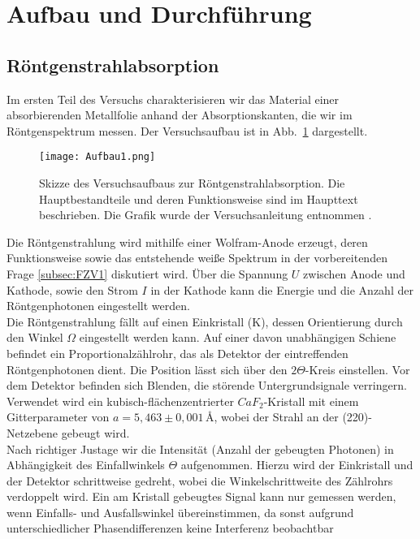 \section{\label{sec:aufbau}Aufbau und Durchführung}
\subsection{\label{subsec:vers1}Röntgenstrahlabsorption}
Im ersten Teil des Versuchs charakterisieren wir das Material einer absorbierenden Metallfolie anhand 
der Absorptionskanten, die wir im Röntgenspektrum messen. Der Versuchsaufbau ist in Abb.~\ref{fig:vers1}
dargestellt.
\begin{figure}[h!]
    \centering
    \texttt{[image: Aufbau1.png]}
    \caption{\label{fig:vers1}Skizze des Versuchsaufbaus zur Röntgenstrahlabsorption. Die Hauptbestandteile und deren 
    Funktionsweise sind im Haupttext beschrieben. Die Grafik wurde der Versuchsanleitung entnommen \cite{Anleitung}.}
\end{figure}\FloatBarrier
Die Röntgenstrahlung wird mithilfe einer Wolfram-Anode erzeugt, deren Funktionsweise 
sowie das entstehende weiße Spektrum in der vorbereitenden 
Frage \ref{subsec:FZV1} diskutiert wird. Über die Spannung $U$ zwischen Anode und 
Kathode, sowie den Strom $I$ in der Kathode kann die Energie und die Anzahl der 
Röntgenphotonen eingestellt werden. \\
Die Röntgenstrahlung fällt auf einen Einkristall (K), dessen Orientierung 
durch den Winkel $\Omega$ eingestellt werden kann. Auf einer davon unabhängigen 
Schiene befindet ein Proportionalzählrohr, das als Detektor der eintreffenden 
Röntgenphotonen dient. Die Position lässt sich über den $2\Theta$-Kreis einstellen. 
Vor dem Detektor befinden sich Blenden, die störende Untergrundsignale 
verringern. \\
Verwendet wird ein kubisch-flächenzentrierter $CaF_{2}$-Kristall mit 
einem Gitterparameter von $a= 5,463\pm 0,001\,\si{\angstrom}$, wobei 
der Strahl an der (220)-Netzebene gebeugt wird. \\
Nach richtiger Justage wir die Intensität (Anzahl der gebeugten Photonen) in 
Abhängigkeit des Einfallwinkels $\Theta$ aufgenommen. Hierzu wird der 
Einkristall und der Detektor schrittweise gedreht, wobei die Winkelschrittweite 
des Zählrohrs verdoppelt wird. Ein am Kristall gebeugtes Signal kann nur 
gemessen werden, wenn Einfalls- und Ausfallswinkel übereinstimmen, da 
sonst aufgrund unterschiedlicher Phasendifferenzen keine Interferenz beobachtbar
